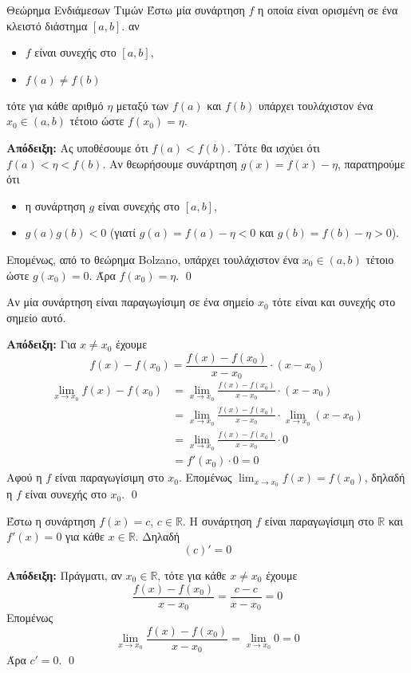 \documentclass[a4paper, 12pt]{article}
\renewenvironment{proof}[1][\textbf{Απόδειξη}]{%
  \par\noindent\textbf{#1:} \rmfamily}{\qed\par}
\begin{document}
\begin{theorem}{Θεώρημα Ενδιάμεσων Τιμών}
  Έστω μία συνάρτηση $f$ η οποία είναι ορισμένη σε ένα κλειστό διάστημα $[a,b]$. αν
  \begin{itemize}
    \item $f$ είναι συνεχής στο $[a,b]$,
    \item $f(a)\ne f(b)$
  \end{itemize}
  τότε για κάθε αριθμό $η$ μεταξύ των $f(a)$ και $f(b)$ υπάρχει τουλάχιστον ένα $x_0\in (a,b)$ τέτοιο ώστε $f(x_0)=η$.
\end{theorem}
\begin{proof}
  Ας υποθέσουμε ότι $f(a)<f(b)$. Τότε θα ισχύει ότι $f(a)<η<f(b)$. Αν θεωρήσουμε συνάρτηση $g(x)=f(x)-η$, παρατηρούμε ότι
  \begin{itemize}
    \item η συνάρτηση $g$ είναι συνεχής στο $[a,b]$,
    \item $g(a)g(b)<0$ (γιατί $g(a)=f(a)-η<0$ και $g(b)=f(b)-η>0$).
  \end{itemize}
  Επομένως, από το θεώρημα Bolzano, υπάρχει τουλάχιστον ένα $x_0\in (a,b)$ τέτοιο ώστε $g(x_0)=0$. Άρα $f(x_0)=η$.
\end{proof}

\begin{theorem}{}
  Αν μία συνάρτηση είναι παραγωγίσιμη σε ένα σημείο $x_0$ τότε είναι και συνεχής στο σημείο αυτό.
\end{theorem}
\begin{proof}
  Για $x\ne x_0$ έχουμε
  $$f(x) -f(x_0)=\frac{f(x)-f(x_0)}{x-x_0}\cdot (x-x_0)$$
  \begin{align*}
    \lim_{x\to x_0}f(x) -f(x_0) & =\lim_{x\to x_0}\frac{f(x) -f(x_0)}{x-x_0}\cdot(x-x_0)                \\
                                & =\lim_{x\to x_0}\frac{f(x) -f(x_0)}{x-x_0}\cdot\lim_{x\to x_0}(x-x_0) \\
                                & =\lim_{x\to x_0}\frac{f(x) -f(x_0)}{x-x_0}\cdot 0                     \\
                                & =f'(x_0) \cdot 0 = 0
  \end{align*}
  Αφού η $f$ είναι παραγωγίσιμη στο $x_0$. Επομένως $\lim_{x\to x_0}f(x)=f(x_0)$, δηλαδή η $f$ είναι συνεχής στο $x_0$.
\end{proof}

\begin{theorem}{}
  Έστω η συνάρτηση $f(x)=c$, $c\in\mathbb{R}$. Η συνάρτηση $f$ είναι παραγωγίσιμη στο $\mathbb{R}$ και $f'(x)=0$ για κάθε $x\in\mathbb{R}$. Δηλαδή
  $$(c)'=0$$
\end{theorem}
\begin{proof}
  Πράγματι, αν $x_0\in\mathbb{R}$, τότε για κάθε $x\ne x_0$ έχουμε
  $$ \frac{f(x)-f(x_0)}{x-x_0}=\frac{c-c}{x-x_0}=0$$
  Επομένως
  $$\lim_{x\to x_0}\frac{f(x)-f(x_0)}{x-x_0}=\lim_{x\to x_0}0=0$$
  Άρα $c'=0$.
\end{proof}
\end{document}
